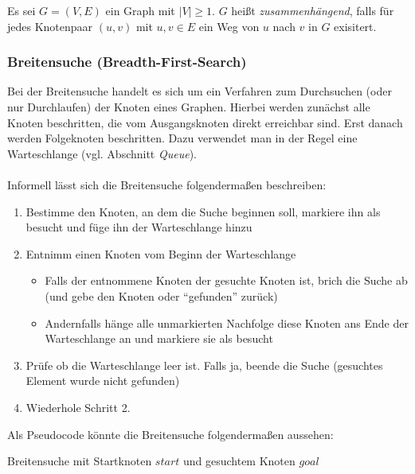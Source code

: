 \begin{defi}
  Es sei $G = (V,E)$ ein Graph mit $|V| \ge 1$. $G$ heißt
  \emph{zusammenhängend}, falls für jedes Knotenpaar $(u,v)$ mit
  $u,v \in E$ ein Weg von $u$ nach $v$ in $G$ exisitert.
\end{defi}

\subsubsection{Breitensuche (Breadth-First-Search)}
Bei der Breitensuche handelt es sich um ein Verfahren zum Durchsuchen (oder nur Durchlaufen) der Knoten eines Graphen. Hierbei werden zunächst alle Knoten beschritten, die vom Ausgangsknoten direkt erreichbar sind. Erst danach werden Folgeknoten beschritten. Dazu verwendet man in der Regel eine Warteschlange (vgl. Abschnitt \emph{Queue}). \\ \\
Informell lässt sich die Breitensuche folgendermaßen beschreiben:
\begin{enumerate}
\item Bestimme den Knoten, an dem die Suche beginnen soll, markiere
  ihn als besucht und füge ihn der Warteschlange hinzu
\item Entnimm einen Knoten vom Beginn der Warteschlange
  \begin{itemize}
  \item Falls der entnommene Knoten der gesuchte Knoten ist, brich die
    Suche ab (und gebe den Knoten oder ``gefunden'' zurück)
  \item Andernfalls hänge alle unmarkierten Nachfolge diese Knoten ans
    Ende der Warteschlange an und markiere sie als besucht
  \end{itemize}
\item Prüfe ob die Warteschlange leer ist. Falls ja, beende die Suche
  (gesuchtes Element wurde nicht gefunden)
\item Wiederhole Schritt 2.
\end{enumerate}
Als Pseudocode könnte die Breitensuche folgendermaßen aussehen:
\begin{algorithm}[H]
  \caption{Breitensuche mit Startknoten $start$ und gesuchtem Knoten
    $goal$}
  \begin{algorithmic}
     
     \EndFor

       \EndIf {} 
     \EndIf \EndFor \EndWhile
     \EndProcedure
  \end{algorithmic}
\end{algorithm}

